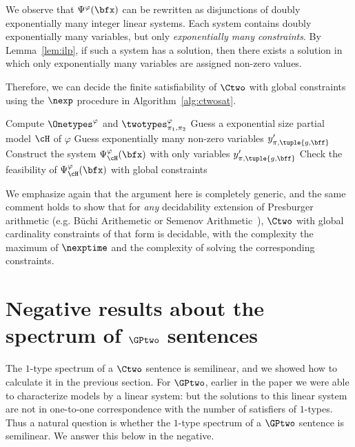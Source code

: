 We observe that $\Psi^\varphi(\bfx)$ can be rewritten as disjunctions of doubly exponentially many integer linear systems.
Each system contains doubly exponentially many variables, but only \emph{exponentially many constraints}.
By Lemma~\ref{lem:ilp}, if such a system has a solution,
then there exists a solution in which only exponentially many variables are assigned non-zero values.

Therefore, we can decide the finite satisfiability of $\Ctwo$ with global constraints 
using the $\nexp$ procedure in Algorithm~\ref{alg:ctwosat}.

\begin{algorithm}
\begin{algorithmic}[1]
\caption{Algorithm for the finite satisfiability problem of $\Ctwo$ with global constraints}\label{alg:ctwosat}
    \State Compute $\Onetypes^\varphi$ and $\twotypes^\varphi_{\pi_1, \pi_2}$
        \State Guess a exponential size partial model $\cH$ of $\varphi$
    \State Guess exponentially many non-zero variables $y'_{\pi, \tuple{g, \bff}}$
    \State Construct the system $\Psi^\varphi_{\cH}(\bfx)$ with only variables $y'_{\pi, \tuple{g, \bff}}$
    \State Check the feasibility of $\Psi^\varphi_{\cH}(\bfx)$ with global constraints
\EndProcedure
\end{algorithmic}
\end{algorithm}

We emphasize again that the argument here is completely generic, and the same comment holds to show that for \emph{any} decidability extension of Presburger arithmetic (e.g. B\"uchi Arithemetic or Semenov Arithmetic~\cite{semenovpresexp}), $\Ctwo$ with global cardinality constraints of that form is decidable, with the complexity the maximum of $\nexptime$ and the complexity of solving the corresponding constraints.



\section{Negative results about the spectrum of $\GPtwo$ sentences} \label{sec:gptwocounter}
The $1$-type spectrum of a $\Ctwo$ sentence is semilinear, and we showed how to calculate it in
the previous section. For $\GPtwo$, earlier in the paper we were able to characterize models by a linear system: but the solutions
to this linear system are not in one-to-one correspondence with the number of satisfiers of $1$-types.
Thus a natural question is whether the $1$-type spectrum of a $\GPtwo$ sentence is semilinear. We answer this below in
the negative.

